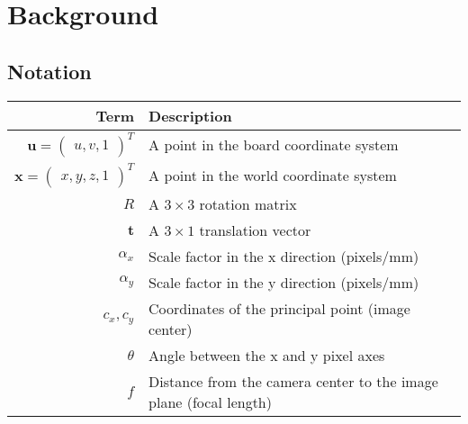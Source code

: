 \chapter{Background}\label{cha:background}

\section{Notation}\label{sec:notation}

\begin{table}[htbp]
	\label{tab:notation}
	\centering
	\begin{tabular}{rl}
		\toprule
		Term                           & Description                                                                                            \\
		\midrule
		\(\mathbf{u} = \begin{pmatrix}
			               u, v, 1
		               \end{pmatrix}^{T}\) & A point in the board coordinate system                                                             \\
		\(\mathbf{x} = \begin{pmatrix}
			               x, y, z, 1
		               \end{pmatrix}^{T}\) & A point in the world coordinate system                                                             \\
		\(R\)                          & A \(3 \times 3\) rotation matrix                                                                       \\
		\(\mathbf{t}\)                 & A \(3 \times 1\) translation vector                                                                    \\
		\(\alpha_x\)                   & Scale factor in the x direction (pixels/mm)                                                            \\
		\(\alpha_y\)                   & Scale factor in the y direction (pixels/mm)                                                            \\
		\(c_x, c_y\)                   & Coordinates of the principal point (image center)                                                      \\
		\(\theta\)                     & Angle between the x and y pixel axes                                                                   \\
		\(f\)                          & Distance from the camera center to the image plane (focal length)                                      \\

\end{tabular}
\end{table}
